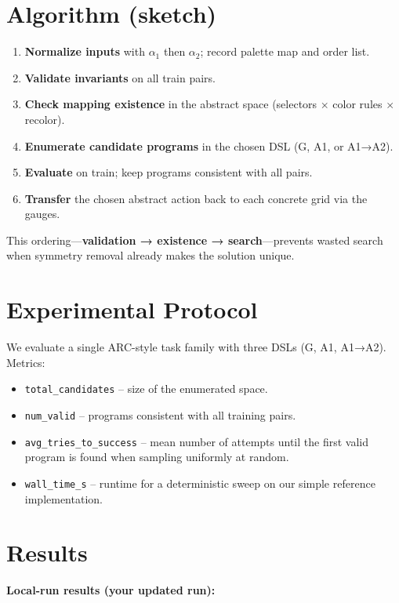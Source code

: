 \documentclass[11pt]{article}
\newcommand{\code}[1]{\texttt{#1}}
\begin{document}
\section{Algorithm (sketch)}

\begin{enumerate}
\item \textbf{Normalize inputs} with $\alpha_1$ then $\alpha_2$; record palette map and order list.
\item \textbf{Validate invariants} on all train pairs.
\item \textbf{Check mapping existence} in the abstract space (selectors $\times$ color rules $\times$ recolor).
\item \textbf{Enumerate candidate programs} in the chosen DSL (G, A1, or A1→A2).
\item \textbf{Evaluate} on train; keep programs consistent with all pairs.
\item \textbf{Transfer} the chosen abstract action back to each concrete grid via the gauges.
\end{enumerate}

This ordering---\textbf{validation → existence → search}---prevents wasted search when symmetry removal already makes the solution unique.

\section{Experimental Protocol}

We evaluate a single ARC-style task family with three DSLs (G, A1, A1→A2). Metrics:
\begin{itemize}
\item \code{total\_candidates} -- size of the enumerated space.
\item \code{num\_valid} -- programs consistent with all training pairs.
\item \code{avg\_tries\_to\_success} -- mean number of attempts until the first valid program is found when sampling uniformly at random.
\item \code{wall\_time\_s} -- runtime for a deterministic sweep on our simple reference implementation.
\end{itemize}

\section{Results}

\textbf{Local-run results (your updated run):}
\end{document}
